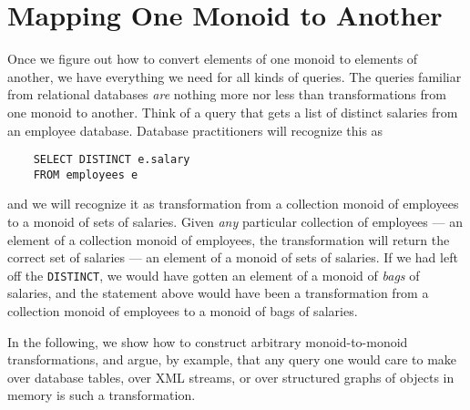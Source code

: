 \section{\color{Red}Mapping One Monoid to Another}


Once we figure out how to convert elements of one monoid to elements of another, we have everything we need for all kinds of queries. The queries familiar from relational databases \emph{are} nothing more nor less than transformations from one monoid to another. Think of a query that gets a list of distinct salaries from an employee database. Database practitioners will recognize this as
\begin{center}
  \begin{verbatim}
    SELECT DISTINCT e.salary
    FROM employees e
  \end{verbatim}
\end{center}
and we will recognize it as transformation from a collection monoid of employees to a monoid of sets of salaries. Given \emph{any} particular collection of employees --- an element of a collection monoid of employees, the transformation will return the correct set of salaries --- an element of a monoid of sets of salaries. If we had left off the \verb"DISTINCT", we would have gotten an element of a monoid of \emph{bags} of salaries, and the statement above would have been a transformation from a collection monoid of employees to a monoid of bags of salaries.


In the following, we show how to construct arbitrary monoid-to-monoid transformations, and argue, by example, that any query one would care to make over database tables, over XML streams, or over structured graphs of objects in memory is such a transformation.


